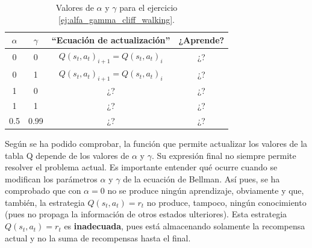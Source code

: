 \documentclass{article}
\begin{document}
\begin{table}[t]
\centering
\begin{tabular}{|c|c|c|c|}
\hline
 $\alpha$ & $\gamma$  & ``Ecuación de actualización''  & ¿Aprende?   \\\hline
 0 & 0 & 
$Q(s_t,a_t)_{i+1} = Q(s_t,a_t)_{i}$ & ¿?\\\hline
 0 & 1 & $Q(s_t,a_t)_{i+1} = Q(s_t,a_t)_{i}$ & ¿?\\\hline
1   & 0  &¿?  &¿?\\\hline
1& 1 & ¿? & ¿?\\\hline
0.5 & 0.99 & ¿? & ¿?\\\hline
\end{tabular}
\caption{Valores de $\alpha$ y $\gamma$ para el ejercicio \ref{ej:alfa_gamma_cliff_walking}.}
\label{tab:alfa_gamma_cliff_walking}
\end{table}



Según se ha podido comprobar, la función que permite actualizar los valores de la tabla Q depende de los valores de $\alpha$ y $\gamma$. Su expresión final no siempre permite resolver el problema actual. Es importante entender qué ocurre cuando se modifican los parámetros $\alpha$ y $\gamma$ de la ecuación de Bellman. Así pues, se ha comprobado que con $\alpha=0$ no se produce ningún aprendizaje, obviamente y que, también, la estrategia $Q(s_t, a_t)=r_t$ no produce, tampoco, ningún conocimiento (pues no propaga la información de otros estados ulteriores). Esta estrategia $Q(s_t,a_t)=r_t$ es \textbf{inadecuada}, pues está almacenando solamente la recompensa actual y no la suma de recompensas hasta el final. 
\end{document}
